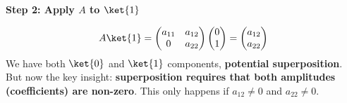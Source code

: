 \highspace
\begin{flushleft}
    \textcolor{Green3}{\textbf{Step 2: Apply $A$ to $\ket{1}$}}
\end{flushleft}
\begin{equation*}
    A\ket{1}
    =
    \begin{pmatrix}
        a_{11} & a_{12} \\ 0 & a_{22}
    \end{pmatrix}
    \begin{pmatrix}
        0 \\ 1
    \end{pmatrix}
    =
    \begin{pmatrix}
        a_{12} \\ a_{22}
    \end{pmatrix}
\end{equation*}
We have both $\ket{0}$ and $\ket{1}$ components, \textbf{potential superposition}. But now the key insight: \textbf{superposition requires that both amplitudes (coefficients) are non-zero}. This only happens if $a_{12} \ne 0$ and $a_{22} \ne 0$.

